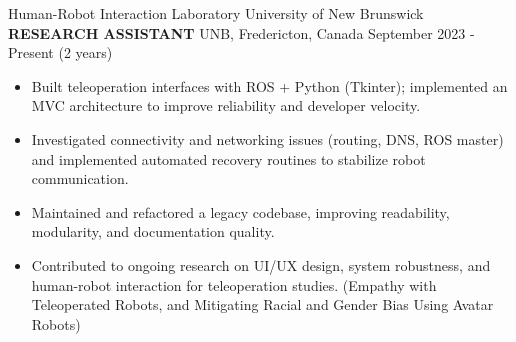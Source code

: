 

\begin{cventries}
    \cventry
    {Human-Robot Interaction Laboratory \textemdash University of New Brunswick}
    {\textbf{RESEARCH ASSISTANT}}
    {UNB, Fredericton, Canada}
    {September 2023 - Present (2 years)}
    {
        \begin{itemize}
            \item Built teleoperation interfaces with ROS + Python (Tkinter); implemented an MVC architecture to improve reliability and developer velocity.
            \item Investigated connectivity and networking issues (routing, DNS, ROS master) and implemented automated recovery routines to stabilize robot communication.
            \item Maintained and refactored a legacy codebase, improving readability, modularity, and documentation quality.
            \item Contributed to ongoing research on UI/UX design, system robustness, and human-robot interaction for teleoperation studies. (Empathy with Teleoperated Robots, and Mitigating Racial and Gender Bias Using Avatar Robots)
        \end{itemize}}
        \vspace{0.4 cm}
\end{cventries}
    

        
        
